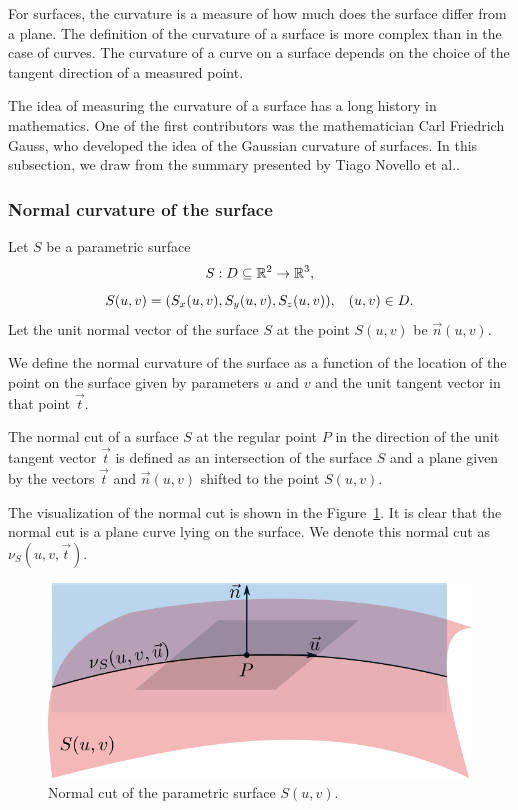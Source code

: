 For surfaces, the curvature is a measure of how much does the surface differ from a 
plane. The definition of the curvature of a surface is more complex than in the case of curves. The curvature of a curve on a surface depends on the 
choice of the tangent direction of a measured point.

The idea of measuring the curvature of a surface has a long history in mathematics.
One of the first contributors was the mathematician Carl Friedrich Gauss, who developed
the idea of the Gaussian curvature of surfaces. In this subsection, we draw from
the summary presented by Tiago Novello et al.\cite{novello2021differential}.

\subsubsection*{Normal curvature of the surface}

Let $S$ be a parametric surface $$S: D \subseteq \mathbb{R}^2 \to \mathbb{R}^3,$$ 
$$S(u, v) = (S_x(u,v), S_y(u,v), S_z(u,v)), \hspace{3mm} (u,v)\in D.$$
Let the unit normal vector of the surface $S$ at the point $S(u, v)$ be $\vec{n}(u, v)$.

We define the normal curvature of the surface as a function of the location of the point
on the surface given by parameters $u$ and $v$ and the unit tangent vector in that point $\vec{t}$. 

\begin{definition}
The normal cut of a surface $S$ at the regular point $P$ in the direction of the unit tangent vector 
$\vec{t}$ is defined as an intersection of the surface $S$ and a plane
given by the vectors $\vec{t}$ and $\vec{n}(u, v)$ shifted to 
the point $S(u, v)$. 
\end{definition}

The visualization of the normal cut is shown in the Figure~\ref{img:14}.
It is clear that the
normal cut is a plane curve lying on the surface. We denote this normal cut as $\nu_S(u, v, \vec{t})$.

\begin{figure}
    \centerline{\includegraphics[scale=0.5]{images/img14}}
    \caption[Normal cut]
    {Normal cut of the parametric surface $S(u,v)$.}
    \label{img:14}
\end{figure}

